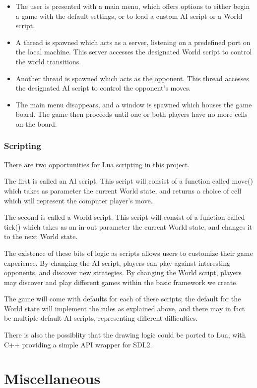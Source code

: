 \documentclass[letterpaper]{article}
\begin{document}
\begin{itemize}
	\item The user is presented with a main menu, which offers options to either begin a game with the default settings, or to load a custom AI script or a World script.
	\item A thread is spawned which acts as a server, listening on a predefined port on the local machine. This server accesses the designated World script to control the world transitions.
	\item Another thread is spawned which acts as the opponent. This thread accesses the designated AI script to control the opponent's moves.
	\item The main menu disappears, and a window is spawned which houses the game board. The game then proceeds until one or both players have no more cells on the board.
\end{itemize}

\subsubsection{Scripting}

There are two opportunities for Lua scripting in this project.

The first is called an AI script. This script will consist of a function called move() which takes as parameter the current World state, and returns a choice of cell which will represent the computer player's move.

The second is called a World script. This script will consist of a function called tick() which takes as an in-out parameter the current World state, and changes it to the next World state.

The existence of these bits of logic as scripts allows users to customize their game experience. By changing the AI script, players can play against interesting opponents, and discover new strategies. By changing the World script, players may discover and play different games within the basic framework we create.

The game will come with defaults for each of these scripts; the default for the World state will implement the rules as explained above, and there may in fact be multiple default AI scripts, representing different difficulties.

There is also the possiblity that the drawing logic could be ported to Lua, with C++ providing a simple API wrapper for SDL2.

\section{Miscellaneous}
\end{document}
